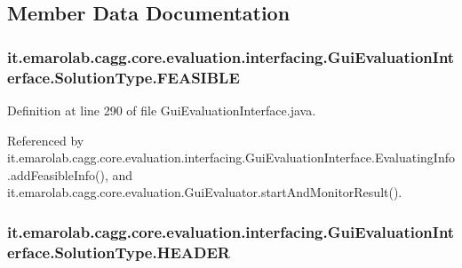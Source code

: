 \subsection{Member Data Documentation}
\hypertarget{enumit_1_1emarolab_1_1cagg_1_1core_1_1evaluation_1_1interfacing_1_1GuiEvaluationInterface_1_1SolutionType_a9f70b219bfc0b92170282eca3ca51e91}{
\subsubsection[{F\-E\-A\-S\-I\-B\-L\-E}]{\setlength{\rightskip}{0pt plus 5cm}it.\-emarolab.\-cagg.\-core.\-evaluation.\-interfacing.\-Gui\-Evaluation\-Interface.\-Solution\-Type.\-F\-E\-A\-S\-I\-B\-L\-E}}\label{enumit_1_1emarolab_1_1cagg_1_1core_1_1evaluation_1_1interfacing_1_1GuiEvaluationInterface_1_1SolutionType_a9f70b219bfc0b92170282eca3ca51e91}


Definition at line 290 of file Gui\-Evaluation\-Interface.\-java.



Referenced by it.\-emarolab.\-cagg.\-core.\-evaluation.\-interfacing.\-Gui\-Evaluation\-Interface.\-Evaluating\-Info.\-add\-Feasible\-Info(), and it.\-emarolab.\-cagg.\-core.\-evaluation.\-Gui\-Evaluator.\-start\-And\-Monitor\-Result().

\hypertarget{enumit_1_1emarolab_1_1cagg_1_1core_1_1evaluation_1_1interfacing_1_1GuiEvaluationInterface_1_1SolutionType_a1e187a8186221804c0e0559b343900c2}{
\subsubsection[{H\-E\-A\-D\-E\-R}]{\setlength{\rightskip}{0pt plus 5cm}it.\-emarolab.\-cagg.\-core.\-evaluation.\-interfacing.\-Gui\-Evaluation\-Interface.\-Solution\-Type.\-H\-E\-A\-D\-E\-R}}\label{enumit_1_1emarolab_1_1cagg_1_1core_1_1evaluation_1_1interfacing_1_1GuiEvaluationInterface_1_1SolutionType_a1e187a8186221804c0e0559b343900c2}


